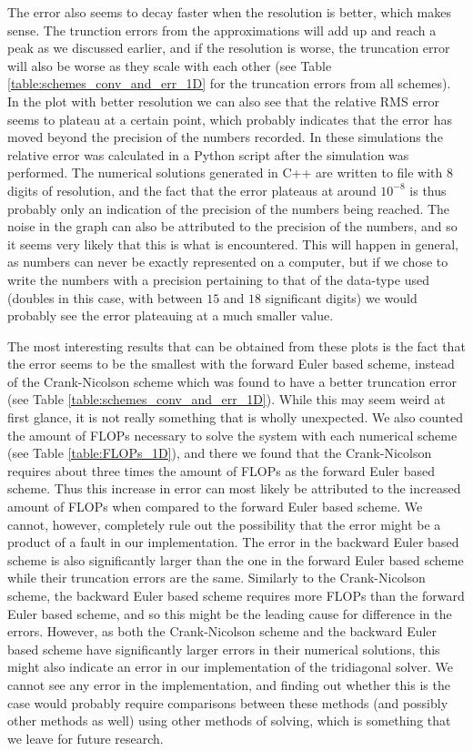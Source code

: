 \documentclass[reprint,english,notitlepage]{revtex4-1}  %
\begin{document}
The error also seems to decay faster when the resolution is better, which makes sense. The trunction errors from the approximations will add up and reach a peak as we discussed earlier, and if the resolution is worse, the truncation error will also be worse as they scale with each other (see Table \ref{table:schemes_conv_and_err_1D} for the truncation errors from all schemes). In the plot with better resolution we can also see that the relative RMS error seems to plateau at a certain point, which probably indicates that the error has moved beyond the precision of the numbers recorded. In these simulations the relative error was calculated in a Python script after the simulation was performed. The numerical solutions generated in C++ are written to file with 8 digits of resolution, and the fact that the error plateaus at around $10^{-8}$ is thus probably only an indication of the precision of the numbers being reached. The noise in the graph can also be attributed to the precision of the numbers, and so it seems very likely that this is what is encountered. This will happen in general, as numbers can never be exactly represented on a computer, but if we chose to write the numbers with a precision pertaining to that of the data-type used (doubles in this case, with between $15$ and $18$ significant digits) we would probably see the error plateauing at a much smaller value. 

The most interesting results that can be obtained from these plots is the fact that the error seems to be the smallest with the forward Euler based scheme, instead of the Crank-Nicolson scheme which was found to have a better truncation error (see Table \ref{table:schemes_conv_and_err_1D}). While this may seem weird at first glance, it is not really something that is wholly unexpected. We also counted the amount of FLOPs necessary to solve the system with each numerical scheme (see Table \ref{table:FLOPs_1D}), and there we found that the Crank-Nicolson requires about three times the amount of FLOPs as the forward Euler based scheme. Thus this increase in error can most likely be attributed to the increased amount of FLOPs when compared to the forward Euler based scheme. We cannot, however, completely rule out the possibility that the error might be a product of a fault in our implementation. The error in the backward Euler based scheme is also significantly larger than the one in the forward Euler based scheme while their truncation errors are the same. Similarly to the Crank-Nicolson scheme, the backward Euler based scheme requires more FLOPs than the forward Euler based scheme, and so this might be the leading cause for difference in the errors. However, as both the Crank-Nicolson scheme and the backward Euler based scheme have significantly larger errors in their numerical solutions, this might also indicate an error in our implementation of the tridiagonal solver. We cannot see any error in the implementation, and finding out whether this is the case would probably require comparisons between these methods (and possibly other methods as well) using other methods of solving, which is something that we leave for future research.
\end{document}
